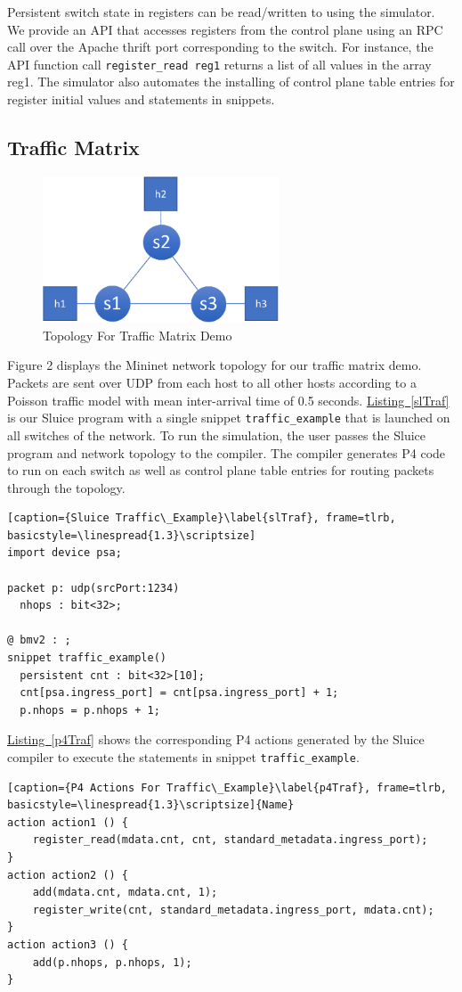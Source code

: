 \documentclass[12pt, oneside]{article}
\newcommand{\irref}[2]{\hyperref[#2]{#1~\ref{#2}}}
\begin{document}
Persistent switch state in registers can be read/written to using the simulator. We provide an API that accesses registers from the control plane using an RPC call over the Apache thrift port corresponding to the switch. For instance, the API function call \texttt{register\_read reg1} returns a list of all values in the array reg1. The simulator also automates the installing of control plane table entries for register initial values and statements in snippets.
\subsection{Traffic Matrix}

\begin{figure}
\centering
\includegraphics[width=70mm,scale=0.7]{figures/traf_mat_topo}
\caption{Topology For Traffic Matrix Demo}
\end{figure}


Figure 2 displays the Mininet network topology for our traffic matrix demo.
Packets are sent over UDP from each host to all other hosts according to a
Poisson traffic model with mean inter-arrival time of 0.5 seconds. \irref{Listing}{slTraf} is our Sluice program with a single snippet \texttt{traffic\_example}
that is launched on all switches of the network. To run the simulation, the
user passes the Sluice program and network topology to the compiler. The
compiler generates P4 code to run on each switch as well as control plane table
entries for routing packets through the topology.  

\begin{lstlisting}[caption={Sluice Traffic\_Example}\label{slTraf}, frame=tlrb, basicstyle=\linespread{1.3}\scriptsize]
import device psa;

packet p: udp(srcPort:1234)
  nhops : bit<32>;

@ bmv2 : ;
snippet traffic_example()
  persistent cnt : bit<32>[10];
  cnt[psa.ingress_port] = cnt[psa.ingress_port] + 1;
  p.nhops = p.nhops + 1;
\end{lstlisting}
\irref{Listing}{p4Traf} shows the corresponding P4 actions generated by the Sluice compiler to execute the statements in snippet \texttt{traffic\_example}.
\begin{lstlisting}[caption={P4 Actions For Traffic\_Example}\label{p4Traf}, frame=tlrb, basicstyle=\linespread{1.3}\scriptsize]{Name}
action action1 () {
    register_read(mdata.cnt, cnt, standard_metadata.ingress_port);
}
action action2 () {
    add(mdata.cnt, mdata.cnt, 1);
    register_write(cnt, standard_metadata.ingress_port, mdata.cnt);
}
action action3 () {
    add(p.nhops, p.nhops, 1);
}
\end{lstlisting}
\end{document}
